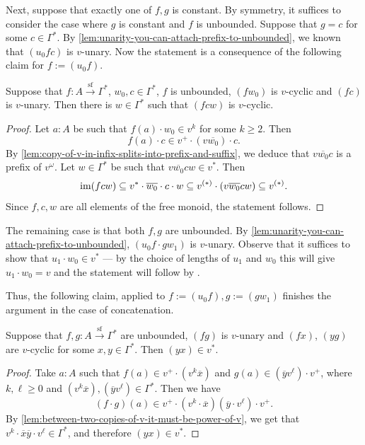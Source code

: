 Next, suppose that exactly one of $f,g$ is constant. By symmetry, it suffices to consider the case where $g$ is constant and $f$ is unbounded. Suppose that $g = c$ for some $c \in \Gamma^*$. By \cref{lem:unarity-you-can-attach-prefix-to-unbounded}, we known that $(u_0 f c)$ is $v$-unary. Now the statement is a consequence of the following claim for $f := (u_0 f)$.

\begin{claim}\label{claim:cyclicity-concat-attaching-constant}
    Suppose that $f : A \xrightarrow{\mathrm{sf}} \Gamma^*$, $w_0, c \in \Gamma^*$, $f$ is unbounded, $(f w_0)$ is $v$-cyclic and $(f c)$ is $v$-unary. Then there is $w \in \Gamma^*$ such that $(f  c  w)$ is $v$-cyclic.
\end{claim}

\begin{proof}
    Let $a : A$ be such that $f(a) \cdot w_0 \in v^k$ for some $k \geq 2$. Then 
    \[
        f(a) \cdot c \in v^+ \cdot (v \overline{w_0}) \cdot c.
    \]
    By \cref{lem:copy-of-v-in-infix-splits-into-prefix-and-suffix}, we deduce that $v \overline{w_0} c$ is a prefix of $v^\omega$. Let $w \in \Gamma^*$ be such that $v \overline{w_0} c w \in v^*$. Then 
    \[
        \operatorname{\mathrm{im}}(f c w) \subseteq v^* \cdot \overline{w_0} \cdot c \cdot w \subseteq v^{(*)} \cdot (v \overline{w_0} c w) \subseteq v^{(*)}.
    \]
    Since $f,c,w$ are all elements of the free monoid, the statement follows.
\end{proof}

The remaining case is that both $f,g$ are unbounded. By \cref{lem:unarity-you-can-attach-prefix-to-unbounded}, $(u_0 f \cdot g w_1)$ is $v$-unary. Observe that it suffices to show that $u_1 \cdot w_0 \in v^*$ --- by the choice of lengths of $u_1$ and $w_0$ this will give $u_1 \cdot w_0 = v$ and the statement will follow by . 

Thus, the following claim, applied to $f := (u_0 f), g:= (g w_1)$ finishes the argument in the case of concatenation.

\begin{claim}\label{claim:cyclicity-concant-both-unbounded}
    Suppose that $f,g : A \xrightarrow{\mathrm{sf}} \Gamma^*$ are unbounded, $(f g)$ is $v$-unary and $(f x)$, $(y g)$ are $v$-cyclic for some $x,y \in \Gamma^*$. Then $(y x) \in v^*$. 
\end{claim}

\begin{proof}
    Take $a : A$ such that $f(a) \in v^+ \cdot (v^k \overline x)$ and $g(a) \in (\overline y v^\ell) \cdot v^+$, where $k, \ell \geq 0$ and $(v^k \overline x), (\overline y v^\ell) \in \Gamma^*$. Then we have 
    \[
        (f \cdot g)(a) \in v^+ \cdot (v^k \cdot \overline x)(\overline y \cdot v^\ell) \cdot v^+.
    \] 
    By \cref{lem:between-two-copies-of-v-it-must-be-power-of-v}, we get that $v^k \cdot \overline x \overline y \cdot v^\ell \in \Gamma^*$, and therefore $(y x) \in v^*$. 
\end{proof}

